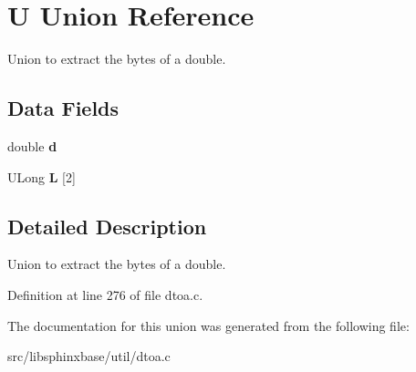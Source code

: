 \section{U Union Reference}
\label{unionU}


Union to extract the bytes of a double.  


\subsection*{Data Fields}
\begin{DoxyCompactItemize}
\item 
double {\bfseries d}\label{unionU_a6379e5194213c802bb8c6786eca8ad50}

\item 
U\-Long {\bfseries L} [2]\label{unionU_aa72022b00fe1608edcdbc0a12e525164}

\end{DoxyCompactItemize}


\subsection{Detailed Description}
Union to extract the bytes of a double. 

Definition at line 276 of file dtoa.\-c.



The documentation for this union was generated from the following file\-:\begin{DoxyCompactItemize}
\item 
src/libsphinxbase/util/dtoa.\-c\end{DoxyCompactItemize}
